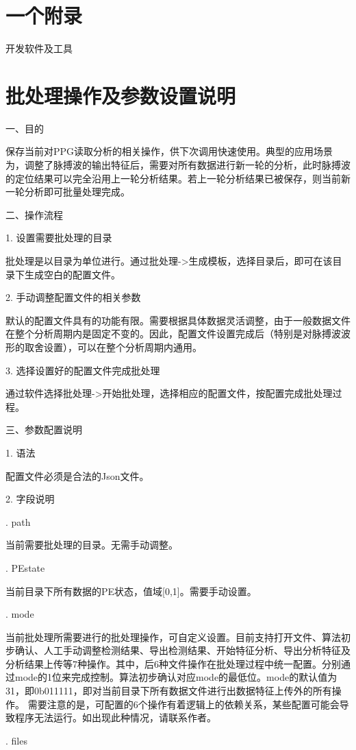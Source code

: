 {\section{一个附录}
开发软件及工具

\section{批处理操作及参数设置说明}
一、目的

保存当前对PPG读取分析的相关操作，供下次调用快速使用。典型的应用场景为，调整了脉搏波的输出特征后，需要对所有数据进行新一轮的分析，此时脉搏波的定位结果可以完全沿用上一轮分析结果。若上一轮分析结果已被保存，则当前新一轮分析即可批量处理完成。

二、操作流程

1. 设置需要批处理的目录

批处理是以目录为单位进行。通过批处理->生成模板，选择目录后，即可在该目录下生成空白的配置文件。

2. 手动调整配置文件的相关参数

默认的配置文件具有的功能有限。需要根据具体数据灵活调整，由于一般数据文件在整个分析周期内是固定不变的。因此，配置文件设置完成后（特别是对脉搏波波形的取舍设置），可以在整个分析周期内通用。

3. 选择设置好的配置文件完成批处理

通过软件选择批处理->开始批处理，选择相应的配置文件，按配置完成批处理过程。

三、参数配置说明

1. 语法

配置文件必须是合法的Json文件。

2. 字段说明

. path 

当前需要批处理的目录。无需手动调整。

. PEstate

当前目录下所有数据的PE状态，值域[0,1]。需要手动设置。

. mode

当前批处理所需要进行的批处理操作，可自定义设置。目前支持打开文件、算法初步确认、人工手动调整检测结果、导出检测结果、开始特征分析、导出分析特征及分析结果上传等7种操作。其中，后6种文件操作在批处理过程中统一配置。分别通过mode的1位来完成控制。算法初步确认对应mode的最低位。mode的默认值为31，即0b011111，即对当前目录下所有数据文件进行出数据特征上传外的所有操作。
需要注意的是，可配置的6个操作有着逻辑上的依赖关系，某些配置可能会导致程序无法运行。如出现此种情况，请联系作者。

. files

}

